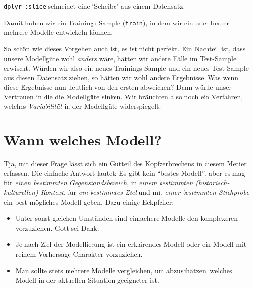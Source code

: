 \documentclass[12pt,ngerman,]{book}
\makeatletter
\newenvironment{Shaded}{\begin{snugshade}}{\end{snugshade}}
\newcommand{\KeywordTok}[1]{\textcolor[rgb]{0.13,0.29,0.53}{\textbf{{#1}}}}
\newcommand{\DataTypeTok}[1]{\textcolor[rgb]{0.13,0.29,0.53}{{#1}}}
\newcommand{\DecValTok}[1]{\textcolor[rgb]{0.00,0.00,0.81}{{#1}}}
\newcommand{\StringTok}[1]{\textcolor[rgb]{0.31,0.60,0.02}{{#1}}}
\newcommand{\CommentTok}[1]{\textcolor[rgb]{0.56,0.35,0.01}{\textit{{#1}}}}
\newcommand{\OtherTok}[1]{\textcolor[rgb]{0.56,0.35,0.01}{{#1}}}
\newcommand{\NormalTok}[1]{{#1}}
\newenvironment{kframe}{%
\medskip{}
\setlength{\fboxsep}{.8em}
 \def\at@end@of@kframe{}%
 \ifinner\ifhmode%
  \def\at@end@of@kframe{\end{minipage}}%
  \begin{minipage}{\columnwidth}%
 \fi\fi%
 \def\FrameCommand##1{\hskip\@totalleftmargin \hskip-\fboxsep
 \colorbox{shadecolor}{##1}\hskip-\fboxsep
     \hskip-\linewidth \hskip-\@totalleftmargin \hskip\columnwidth}%
 \MakeFramed {\advance\hsize-\width
   \@totalleftmargin\z@ \linewidth\hsize
   \@setminipage}}%
 {\par\unskip\endMakeFramed%
 \at@end@of@kframe}
\renewenvironment{Shaded}{\begin{kframe}}{\end{kframe}}
\theoremstyle{definition}
\theoremstyle{definition}
\theoremstyle{remark}
\makeatother
\begin{document}
\texttt{dplyr::slice} schneidet eine `Scheibe' aus einem Datensatz.

\begin{Shaded}
\end{Shaded}

Damit haben wir ein Trainings-Sample (\texttt{train}), in dem wir ein
oder besser mehrere Modelle entwickeln können.

So schön wie dieses Vorgehen auch ist, es ist nicht perfekt. Ein
Nachteil ist, dass unsere Modellgüte wohl \emph{anders} wäre, hätten wir
andere Fälle im Test-Sample erwischt. Würden wir also ein neues
Trainings-Sample und ein neues Test-Sample aus diesen Datensatz ziehen,
so hätten wir wohl andere Ergebnisse. Was wenn diese Ergebnisse nun
deutlich von den ersten abweichen? Dann würde unser Vertrauen in die die
Modellgüte sinken. Wir bräuchten also noch ein Verfahren, welches
\emph{Variabilität} in der Modellgüte widerspiegelt.

\section{Wann welches Modell?}\label{wann-welches-modell}

Tja, mit dieser Frage lässt sich ein Gutteil des Kopfzerbrechens in
diesem Metier erfassen. Die einfache Antwort lautet: Es gibt kein
``bestes Modell'', aber es mag für \emph{einen bestimmten
Gegenstandsbereich}, in \emph{einem bestimmten (historisch-kulturellen)
Kontext}, für \emph{ein bestimmtes Ziel} und mit \emph{einer bestimmten
Stichprobe} ein best mögliches Modell geben. Dazu einige Eckpfeiler:

\begin{itemize}
\item
  Unter sonst gleichen Umständen sind einfachere Modelle den komplexeren
  vorzuziehen. Gott sei Dank.
\item
  Je nach Ziel der Modellierung ist ein erklärendes Modell oder ein
  Modell mit reinem Vorhersage-Charakter vorzuziehen.
\item
  Man sollte stets mehrere Modelle vergleichen, um abzuschätzen, welches
  Modell in der aktuellen Situation geeigneter ist.
\end{itemize}
\end{document}
